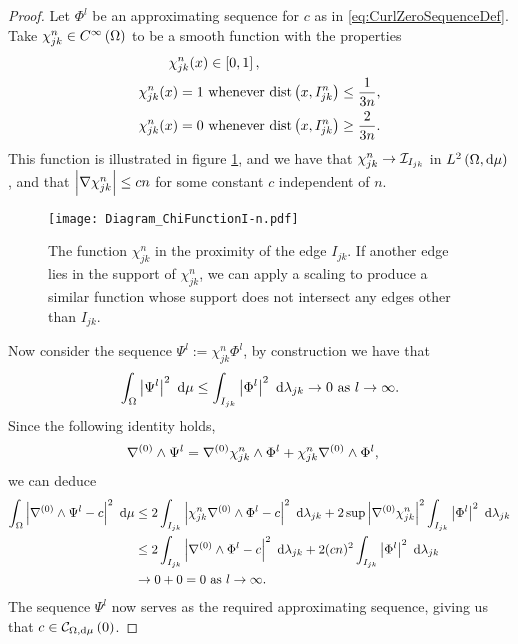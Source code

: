 \begin{proof}
	Let $\Phi^l$ be an approximating sequence for $c$ as in \eqref{eq:CurlZeroSequenceDef}.
	Take $\chi_{jk}^n\in C^{\infty}\left( \Omega \right)$ to be a smooth function with the properties
	\begin{align*}
		\chi_{jk}^n(x) &\in\sqbracs{0,1}, \\
		\chi_{jk}^n(x) = 1 \ &\text{whenever} \ \mathrm{dist}\bracs{x, I_{jk}^n} \leq \recip{3n}, \\
		\chi_{jk}^n(x) = 0 \ &\text{whenever} \ \mathrm{dist}\bracs{x, I_{jk}^n} \geq \frac{2}{3n}.
	\end{align*}
	This function is illustrated in figure \ref{fig:Diagram_ChiFunctionI-n}, and we have that $\chi_{jk}^n\rightarrow \mathcal{I}_{I_{jk}}$ in $L^{2}\left( \Omega,\mathrm{d}\mu \right)$, and that $\left\lvert \nabla\chi_{jk}^n \right\rvert\leq cn$ for some constant $c$ independent of $n$.
	\begin{figure}[t]
		\centering
		\texttt{[image: Diagram\_ChiFunctionI-n.pdf]}
		\caption{\label{fig:Diagram_ChiFunctionI-n} The function $\chi_{jk}^n$ in the proximity of the edge $I_{jk}$. If another edge lies in the support of $\chi_{jk}^n$, we can apply a scaling to produce a similar function whose support does not intersect any edges other than $I_{jk}$.}
	\end{figure}
	Now consider the sequence $\Psi^l := \chi_{jk}^n \Phi^l$, by construction we have that
	\begin{align*}
		\int_{\Omega} \left\lvert \Psi^l \right\rvert^2  \ \mathrm{d}\mu \leq \int_{I_{jk}} \left\lvert \Phi^l \right\rvert^2  \ \mathrm{d}\lambda_{jk} \rightarrow 0 \ \text{as} \ l \rightarrow\infty.
	\end{align*}
	Since the following identity holds,
	\begin{align*}
		\nabla^{(0)}\wedge\Psi^l &= \nabla^{(0)}\chi_{jk}^n\wedge\Phi^l + \chi_{jk}^n\nabla^{(0)}\wedge\Phi^l,
	\end{align*}
	we can deduce
	\begin{align*}
		\int_{\Omega} \left\lvert  \nabla^{(0)}\wedge\Psi^l - c  \right\rvert^2  \ \mathrm{d}\mu
		&\leq 2\int_{I_{jk}} \left\lvert  \chi_{jk}^n\nabla^{(0)}\wedge\Phi^l - c  \right\rvert^2  \ \mathrm{d}\lambda_{jk}
		+ 2\sup\left\lvert \nabla^{(0)}\chi_{jk}^n \right\rvert^2 \int_{I_{jk}} \left\lvert  \Phi^l  \right\rvert^2  \ \mathrm{d}\lambda_{jk} \\
		&\leq2\int_{I_{jk}} \left\lvert  \nabla^{(0)}\wedge\Phi^l - c  \right\rvert^2  \ \mathrm{d}\lambda_{jk}
		+ 2(cn)^2 \int_{I_{jk}} \left\lvert  \Phi^l  \right\rvert^2  \ \mathrm{d}\lambda_{jk} \\
		&\rightarrow 0+0 = 0 \ \text{as} \ l \rightarrow\infty.
	\end{align*}
	The sequence $\Psi^l$ now serves as the required approximating sequence, giving us that $c\in\mathcal{C}_{ \Omega, \mathrm{d}\mu}\left( 0 \right)$.
\end{proof}

